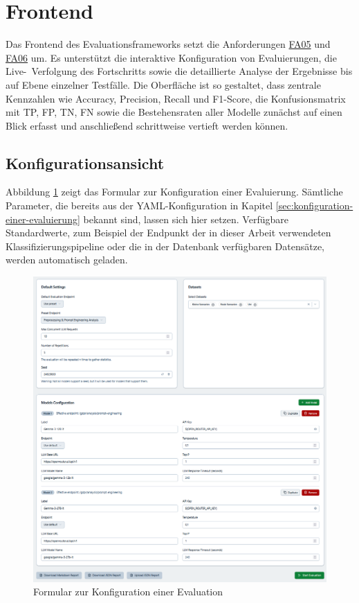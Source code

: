 \section{Frontend}\label{sec:visualisierung-im-frontend}

Das Frontend des Evaluationsframeworks setzt die Anforderungen \hyperlink{FA05}{FA05} und \hyperlink{FA06}{FA06} um. Es unterstützt die interaktive Konfiguration von Evaluierungen, die Live-\linebreak~Verfolgung des Fortschritts sowie die detaillierte Analyse der Ergebnisse bis auf Ebene einzelner Testfälle. Die Oberfläche ist so gestaltet, dass zentrale Kennzahlen wie Accuracy, Precision, Recall und F1-Score, die Konfusionsmatrix mit \ac{TP}, \ac{FP}, \ac{TN}, \ac{FN} sowie die Bestehensraten aller Modelle zunächst auf einen Blick erfasst und anschließend schrittweise vertieft werden können.

\subsection*{Konfigurationsansicht}

Abbildung \ref{fig:evaluation-config} zeigt das Formular zur Konfiguration einer Evaluierung. Sämtliche Parameter, die bereits aus der YAML-Konfiguration in Kapitel \ref{sec:konfiguration-einer-evaluierung} bekannt sind, lassen sich hier setzen. Verfügbare Standardwerte, zum Beispiel der Endpunkt der in dieser Arbeit verwendeten Klassifizierungspipeline oder die in der Datenbank verfügbaren Datensätze, werden automatisch geladen.

\begin{figure}[h]
    \centering
    \includegraphics[width=\textwidth]{images/evaluation/evaluation-config_new}
    \caption{Formular zur Konfiguration einer Evaluation}
    \label{fig:evaluation-config}
\end{figure}

